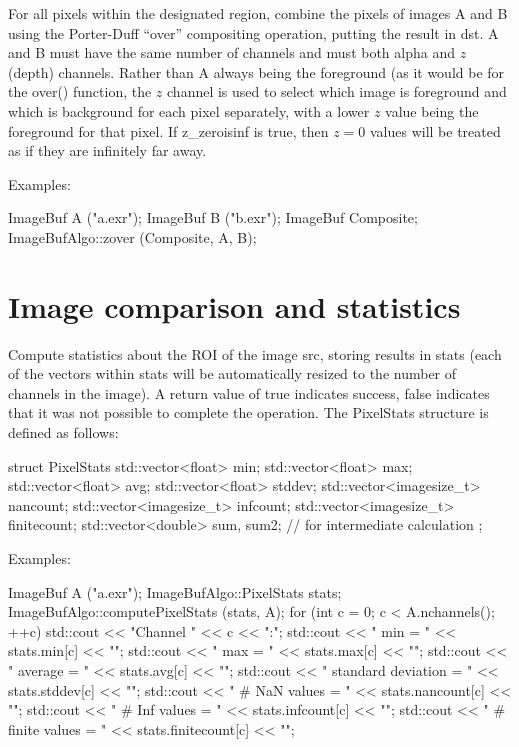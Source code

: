 For all pixels within the designated region, combine the pixels of
images {\cf A} and {\cf B} using the Porter-Duff ``over'' compositing
operation, putting the result in {\cf dst}.  {\cf A} and {\cf B} must
have the same number of channels and must both alpha and $z$ (depth)
channels. Rather than {\cf A} always being the foreground (as it would
be for the {\cf over()} function, the $z$ channel is used to select
which image is foreground and which is background for each pixel
separately, with a lower $z$ value being the foreground for that pixel.
If {\cf z_zeroisinf} is {\cf true}, then $z=0$ values will be treated
as if they are infinitely far away.

\smallskip
\noindent Examples:
\begin{code}
    ImageBuf A ("a.exr");
    ImageBuf B ("b.exr");
    ImageBuf Composite;
    ImageBufAlgo::zover (Composite, A, B);
\end{code}
\apiend


\section{Image comparison and statistics}
\label{sec:iba:stats}

 
\label{sec:iba:computePixelStats}

Compute statistics about the ROI of the image {\cf src}, storing results
in {\cf stats} (each of the vectors within {\cf stats} will be
automatically resized to the number of channels in the image).  A return
value of {\cf true} indicates success, {\cf false} indicates that it was
not possible to complete the operation.
 The {\cf PixelStats} structure is defined as follows:
\begin{code}
struct PixelStats {
    std::vector<float> min;
    std::vector<float> max;
    std::vector<float> avg;
    std::vector<float> stddev;
    std::vector<imagesize_t> nancount;
    std::vector<imagesize_t> infcount;
    std::vector<imagesize_t> finitecount;
    std::vector<double> sum, sum2;  // for intermediate calculation
};
\end{code}

\smallskip
\noindent Examples:
\begin{code}
    ImageBuf A ("a.exr");
    ImageBufAlgo::PixelStats stats;
    ImageBufAlgo::computePixelStats (stats, A);
    for (int c = 0;  c < A.nchannels();  ++c) {
        std::cout << "Channel " << c << ":\n";
        std::cout << "   min = " << stats.min[c] << "\n";
        std::cout << "   max = " << stats.max[c] << "\n";
        std::cout << "   average = " << stats.avg[c] << "\n";
        std::cout << "   standard deviation  = " << stats.stddev[c] << "\n";
        std::cout << "   # NaN values    = " << stats.nancount[c] << "\n";
        std::cout << "   # Inf values    = " << stats.infcount[c] << "\n";
        std::cout << "   # finite values = " << stats.finitecount[c] << "\n";
    }
\end{code}
\apiend

